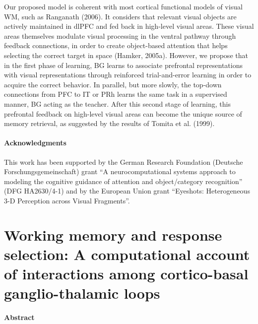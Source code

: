 \documentclass[
  11pt,
  a4paper,
]{scrbook}
\begin{document}
Our proposed model is coherent with most cortical functional models of
visual WM, such as Ranganath (2006). It considers that relevant visual
objects are actively maintained in dlPFC and fed back in high-level
visual areas. These visual areas themselves modulate visual processing
in the ventral pathway through feedback connections, in order to create
object-based attention that helps selecting the correct target in space
(Hamker, 2005a). However, we propose that in the first phase of
learning, BG learns to associate prefrontal representations with visual
representations through reinforced trial-and-error learning in order to
acquire the correct behavior. In parallel, but more slowly, the top-down
connections from PFC to IT or PRh learns the same task in a supervised
manner, BG acting as the teacher. After this second stage of learning,
this prefrontal feedback on high-level visual areas can become the
unique source of memory retrieval, as suggested by the results of Tomita
et al. (1999).

\subsubsection*{Acknowledgments}\label{acknowledgments}

This work has been supported by the German Research Foundation (Deutsche
Forschungsgemeinschaft) grant ``A neurocomputational systems approach to
modeling the cognitive guidance of attention and object/category
recognition'' (DFG HA2630/4-1) and by the European Union grant
``Eyeshots: Heterogeneous 3-D Perception across Visual Fragments''.


\chapter{Working memory and response selection: A computational account
of interactions among cortico-basal ganglio-thalamic
loops}\label{sec-chapter:WM}


\subsubsection*{Abstract}\label{abstract-3}
\end{document}
